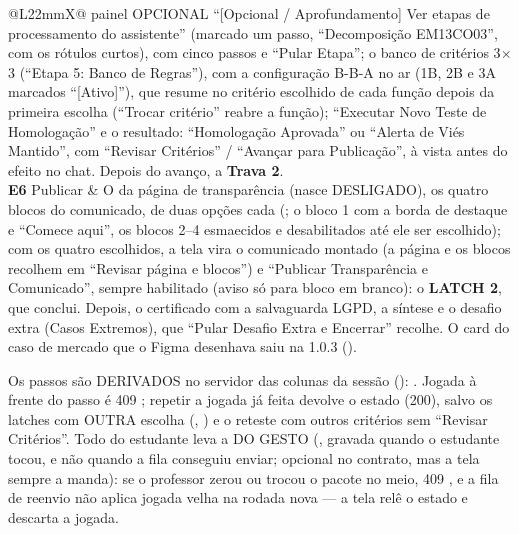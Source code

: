 \begin{tabularx}{\linewidth}{@{}L{22mm}X@{}}
  painel OPCIONAL \enquote{[Opcional / Aprofundamento] Ver etapas de
  processamento do assistente} (marcado um passo, \enquote{Decomposição
  EM13CO03}, com os rótulos curtos), com cinco passos e \enquote{Pular
  Etapa}; o banco de critérios 3$\times$3 (\enquote{Etapa 5: Banco de
  Regras}), com a configuração B-B-A no ar (1B, 2B e 3A marcados
  \enquote{[Ativo]}), que resume no critério escolhido de cada função depois
  da primeira escolha (\enquote{Trocar critério} reabre a função);
  \enquote{Executar Novo Teste de Homologação} e
  o resultado: \enquote{Homologação Aprovada} ou \enquote{Alerta de Viés
  Mantido}, com \enquote{Revisar Critérios} / \enquote{Avançar para
  Publicação}, à vista antes do efeito no chat. Depois do avanço, a
  \textbf{Trava 2}.\\
\zebra \textbf{E6} Publicar & O  da página de transparência
  (nasce DESLIGADO), os quatro blocos do comunicado, de duas opções cada
  (; o bloco 1 com a borda de destaque e \enquote{Comece
  aqui}, os blocos 2--4 esmaecidos e desabilitados até ele ser escolhido);
  com os quatro escolhidos, a tela vira o comunicado montado (a página e os
  blocos recolhem em \enquote{Revisar página e blocos}) e \enquote{Publicar
  Transparência e Comunicado}, sempre habilitado (aviso só para bloco em
  branco): o \textbf{LATCH 2}, que conclui. Depois, o certificado com a
  salvaguarda LGPD, a síntese e o desafio extra (Casos Extremos), que
  \enquote{Pular Desafio Extra e Encerrar} recolhe. O card do caso de
  mercado que o Figma desenhava saiu na 1.0.3 ().\\
\bottomrule
\end{tabularx}

Os passos são DERIVADOS no servidor das colunas da sessão
():  \seta{}  \seta{}
 \seta{}  \seta{}  \seta{}
 \seta{}  \seta{}  \seta{}
 \seta{}  \seta{}  \seta{}
. Jogada à frente do passo é 409 ; repetir
a jogada já feita devolve o estado (200), salvo os latches com OUTRA escolha
(, ) e o reteste com outros critérios sem
\enquote{Revisar Critérios}. Todo  do estudante leva a
 DO GESTO (, gravada quando o
estudante tocou, e não quando a fila conseguiu enviar; opcional no contrato,
mas a tela sempre a manda): se o professor zerou ou trocou o pacote no meio,
409 , e a fila de reenvio não aplica jogada velha na rodada
nova --- a tela relê o estado e descarta a jogada.

